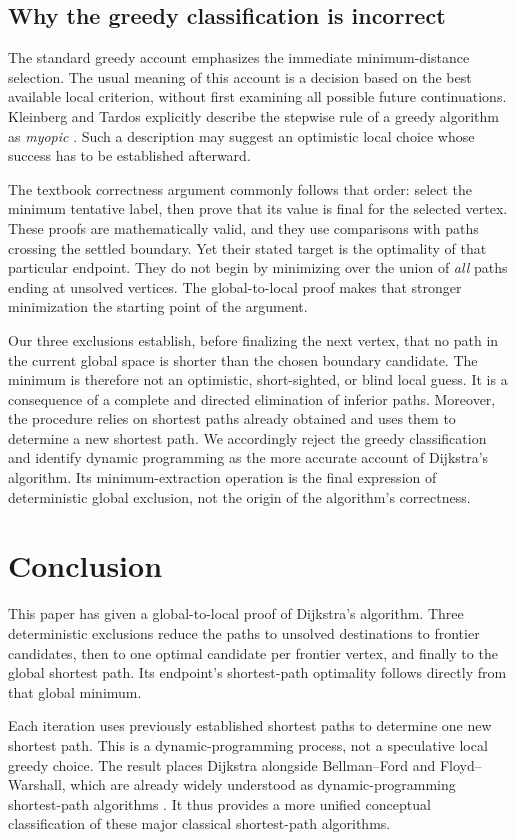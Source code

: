 \documentclass[11pt]{article}
\begin{document}
\subsection{Why the greedy classification is incorrect}
The standard greedy account emphasizes the immediate minimum-distance selection. The usual meaning of this account is a decision based on the best available local criterion, without first examining all possible future continuations. Kleinberg and Tardos explicitly describe the stepwise rule of a greedy algorithm as \emph{myopic} \cite{KleinbergTardos2006}. Such a description may suggest an optimistic local choice whose success has to be established afterward.

The textbook correctness argument commonly follows that order: select the minimum tentative label, then prove that its value is final for the selected vertex. These proofs are mathematically valid, and they use comparisons with paths crossing the settled boundary. Yet their stated target is the optimality of that particular endpoint. They do not begin by minimizing over the union of \emph{all} paths ending at unsolved vertices. The global-to-local proof makes that stronger minimization the starting point of the argument.

Our three exclusions establish, before finalizing the next vertex, that no path in the current global space is shorter than the chosen boundary candidate. The minimum is therefore not an optimistic, short-sighted, or blind local guess. It is a consequence of a complete and directed elimination of inferior paths. Moreover, the procedure relies on shortest paths already obtained and uses them to determine a new shortest path. We accordingly reject the greedy classification and identify dynamic programming as the more accurate account of Dijkstra's algorithm. Its minimum-extraction operation is the final expression of deterministic global exclusion, not the origin of the algorithm's correctness.

\section{Conclusion}
This paper has given a global-to-local proof of Dijkstra's algorithm. Three deterministic exclusions reduce the paths to unsolved destinations to frontier candidates, then to one optimal candidate per frontier vertex, and finally to the global shortest path. Its endpoint's shortest-path optimality follows directly from that global minimum.

Each iteration uses previously established shortest paths to determine one new shortest path. This is a dynamic-programming process, not a speculative local greedy choice. The result places Dijkstra alongside Bellman--Ford and Floyd--Warshall, which are already widely understood as dynamic-programming shortest-path algorithms \cite{CLRS2022}. It thus provides a more unified conceptual classification of these major classical shortest-path algorithms.
\end{document}
